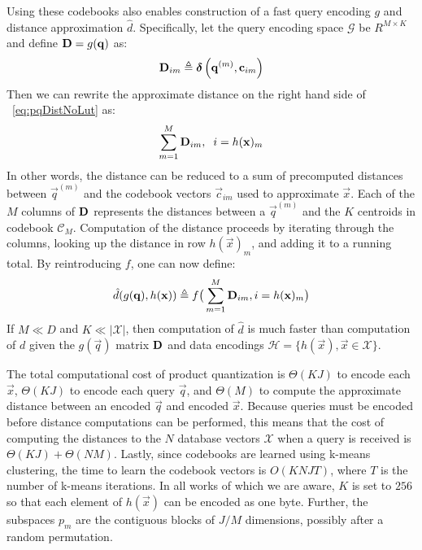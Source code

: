 Using these codebooks also enables construction of a fast query encoding $g$ and distance approximation $\hat{d}$. Specifically, let the query encoding space $\mathcal{G}$ be $R^{M \times K}$ and define $\mathbf{D} = g(\mathbf{q})$ as: %
\begin{align}
    \mathbf{D}_{im} \triangleq \boldsymbol{\delta} \left( \mathbf{q}^{(m)}, \mathbf{c}_{im} \right)
\end{align}
Then we can rewrite the approximate distance on the right hand side of ~\ref{eq:pqDistNoLut} as:
\begin{align} \label{eq:pqDist}
        \sum_{m=1}^M \mathbf{D}_{im}, \hspace{2mm} i = h(\mathbf{x})_m
\end{align}
In other words, the distance can be reduced to a sum of precomputed distances between $\vec{q}^{(m)}$ and the codebook vectors $\vec{c}_{im}$ used to approximate $\vec{x}$. Each of the $M$ columns of $\mathbf{D}$ represents the distances between a $\vec{q}^{(m)}$ and the $K$ centroids in codebook $\mathcal{C}_M$. Computation of the distance proceeds by iterating through the columns, looking up the distance in row $h(\vec{x})_m$, and adding it to a running total. By reintroducing $f$, one can now define:
\begin{align} \label{eq:pq_dhat}
    \hat{d}(g(\mathbf{q}), h(\mathbf{x})) \triangleq f \big( \sum_{m=1}^M \mathbf{D}_{im}, i = h(\mathbf{x})_m \big)
\end{align}
If $M \ll D$ and $K \ll |\mathcal{X}|$, then computation of $\hat{d}$ is much faster than computation of $d$ given the $g(\vec{q})$ matrix $\mathbf{D}$ and data encodings $\mathcal{H} = \{h(\vec{x}), \vec{x} \in \mathcal{X} \}$.

The total computational cost of product quantization is $\Theta(KJ)$ to encode each $\vec{x}$, $\Theta(KJ)$ to encode each query $\vec{q}$, and $\Theta(M)$ to compute the approximate distance between an encoded $\vec{q}$ and encoded $\vec{x}$. Because queries must be encoded before distance computations can be performed, this means that the cost of computing the distances to the $N$ database vectors $\mathcal{X}$ when a query is received is $\Theta(KJ) + \Theta(NM)$. Lastly, since codebooks are learned using k-means clustering, the time to learn the codebook vectors is $O(KNJT)$, where $T$ is the number of k-means iterations. In all works of which we are aware, $K$ is set to $256$ so that each element of $h(\vec{x})$ can be encoded as one byte. Further, the subspaces $p_m$ are the contiguous blocks of $J/M$ dimensions, possibly after a random permutation.

